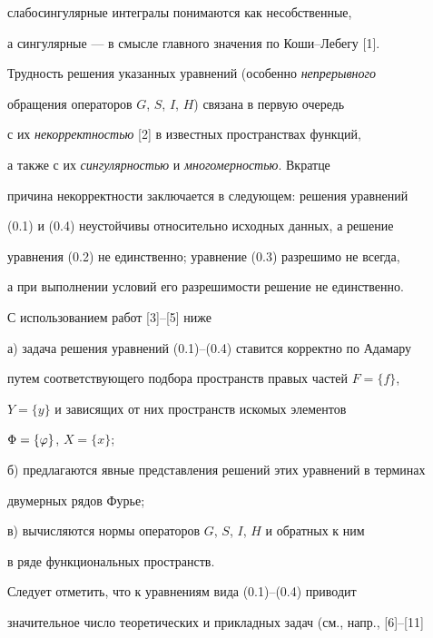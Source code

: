 слабосингулярные интегралы понимаются как несобственные,


а сингулярные --- в смысле главного значения по Коши--Лебегу [1]. 





Трудность решения указанных уравнений (особенно {\it непрерывного} 


обращения операторов $G$, $S$, $I$, $H$) связана в первую очередь


с их {\it некорректностью} [2] в известных пространствах функций,


а также с их {\it сингулярностью} и {\it многомерностью}. Вкратце


причина некорректности заключается в следующем: решения уравнений


(0.1) и (0.4) неустойчивы относительно исходных данных, а решение


уравнения (0.2) не единственно; уравнение (0.3) разрешимо не всегда, 


а при выполнении условий его разрешимости решение не единственно.





С использованием работ [3]--[5] ниже





а) задача решения уравнений (0.1)--(0.4) ставится корректно по Адамару 


путем соответствующего подбора пространств правых частей $F=\{f\}$,


$Y=\{y\}$ и зависящих от них пространств искомых элементов


$\Phi = \{\varphi\}$, $X=\{x\}$;





б) предлагаются явные представления решений этих уравнений в терминах 


двумерных рядов Фурье;





в) вычисляются нормы операторов $G$, $S$, $I$, $H$ и обратных к ним 


в ряде функциональных пространств.





Следует отметить, что к уравнениям вида (0.1)--(0.4) приводит 


значительное число теоретических и прикладных задач (см., напр., [6]--[11]


